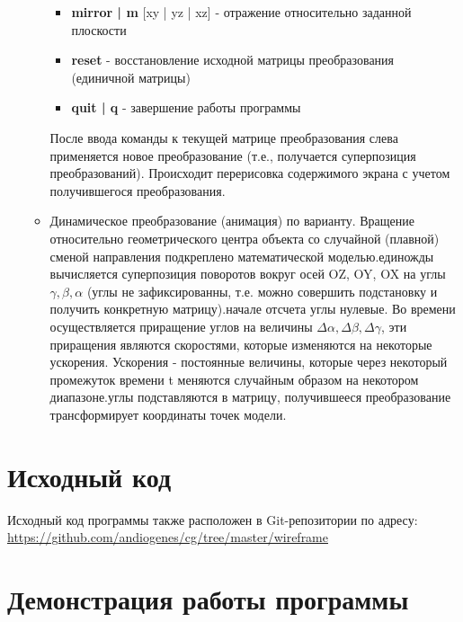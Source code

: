 \documentclass[a4paper,12pt]{article}
\begin{document}
\begin{flushleft}
\begin{enumerate}
\begin{itemize}
\begin{itemize}
            \item \textbf{mirror | m} [xy | yz | xz] - отражение относительно заданной плоскости
            \item \textbf{reset} - восстановление исходной матрицы преобразования (единичной матрицы)
            \item \textbf{quit | q} - завершение работы программы
          \end{itemize}
          После ввода команды к текущей матрице преобразования слева применяется новое преобразование (т.е., получается суперпозиция преобразований). Происходит перерисовка содержимого экрана с учетом получившегося преобразования.
        \item Динамическое преобразование (анимация) по варианту. Вращение относительно геометрического центра объекта со случайной (плавной) сменой направления подкреплено математической моделью.\linebreak{} единожды вычисляется суперпозиция поворотов вокруг осей OZ, OY, OX на углы \(\gamma, \beta, \alpha\) (углы не зафиксированны, т.е. можно совершить подстановку и получить конкретную матрицу).\linebreak{} начале отсчета углы нулевые. Во времени осуществляется приращение углов на величины \(\Delta\alpha, \Delta\beta, \Delta\gamma\), эти приращения являются скоростями, которые изменяются на некоторые ускорения. Ускорения - постоянные величины, которые через некоторый промежуток времени t меняются случайным образом на некотором диапазоне.\linebreak{} углы подставляются в матрицу, получившееся преобразование трансформирует координаты точек модели.
      \end{itemize}
  \end{enumerate}
\end{flushleft}

\section{\normalsize{Исходный код}}
Исходный код программы также расположен в Git-репозитории по адресу: \url{https://github.com/andiogenes/cg/tree/master/wireframe}

\section{\normalsize{Демонстрация работы программы}}
\end{document}
